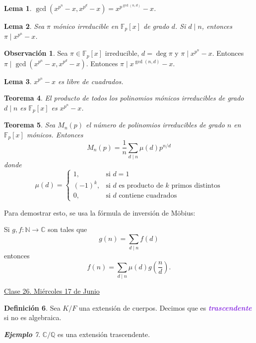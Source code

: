 \documentclass{article}
\newtheorem{theorem}{Teorema}[subsection]
\newtheorem{lemma}[theorem]{Lema}
\theoremstyle{definition}
\newtheorem{definition}[theorem]{Definición}
\newtheorem*{obs}{Observación}
\theoremstyle{remark}
\newtheorem{example}[theorem]{\textbf{Ejemplo}}
\numberwithin{equation}{section}
\newcommand{\C}{\mathbb{C}}
\newcommand{\F}{\mathbb{F}}
\newcommand{\N}{\mathbb{N}}
\newcommand{\Q}{\mathbb{Q}}
\newcommand{\br}[1]{\left( #1 \right)}
\newcommand{\wea}[1]{\textcolor{BlueViolet}{\textbf{\emph{#1}}}}
\newcommand{\fecha}[1]{\begin{flushright} \underline{#1} \end{flushright}}
\begin{document}
\begin{lemma}
  $\gcd(x^{p^n}-x,x^{p^d}-x) = x^{p^{\gcd(n,d)}}-x$.
\end{lemma}

\begin{lemma}
  Sea $\pi$ mónico irreducible en $\F_p[x]$ de grado $d$. Si $d \mid n$, entonces $\pi \mid x^{p^n}-x$.
\end{lemma}

\begin{obs}
  Sea $\pi \in \F_p[x]$ irreducible, $d = \deg\pi$ y $\pi \mid x^{p^n}-x$. Entonces $\pi \mid \gcd(x^{p^n}-x,x^{p^d}-x)$. Entonces $\pi \mid x^{\gcd(n,d)}-x$.
\end{obs}

\begin{lemma}
  $x^{p^n}-x$ es libre de cuadrados.
\end{lemma}

\begin{theorem}
  El producto de todos los polinomios mónicos irreducibles de grado $d \mid n$ es $\F_p[x]$ es $x^{p^n}-x$.
\end{theorem}

\begin{theorem}
  Sea $M_n(p)$ el número de polinomios irreducibles de grado $n$ en $\F_p[x]$ mónicos. Entonces
  \[ M_n(p) = \frac{1}{n} \sum_{d \mid n} \mu(d) p^{n/d} \]
  donde
  \[ \mu(d) = \begin{cases}
    1, &\text{si $d = 1$} \\
    (-1)^k, &\text{si $d$ es producto de $k$ primos distintos} \\
    0, &\text{si $d$ contiene cuadrados}
  \end{cases} \]
\end{theorem}

Para demostrar esto, se usa la fórmula de inversión de Möbius:

Si $g,f \colon \N \to \C$ son tales que
\[ g(n) = \sum_{d \mid n} f(d) \]
entonces 
\[ f(n) = \sum_{d \mid n} \mu(d) g\br{\frac{n}{d}}. \]

\fecha{Clase 26. Miércoles 17 de Junio}

\begin{definition}
  Sea $K/F$ una extensión de cuerpos. Decimos que es \wea{trascendente} si no es algebraica.
\end{definition}

\begin{example}
  $\C/\Q$ es una extensión trascendente.
\end{example}
\end{document}

